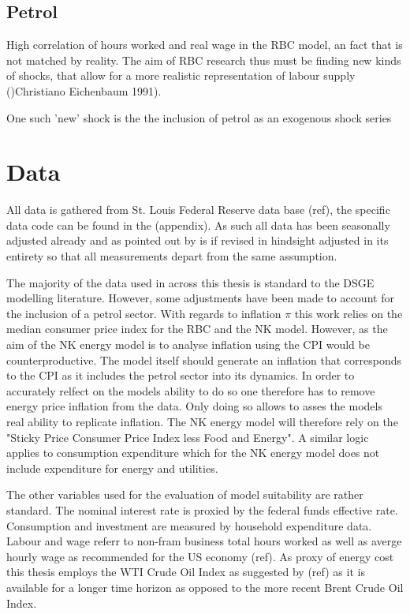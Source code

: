 \documentclass[12pt,a4paper,english]{article} %
\let\oldsection\section
\renewcommand\section{\clearpage\oldsection}
\begin{document}
	
	\subsection{Petrol}
	High correlation of hours worked and real wage in the RBC model, an fact that is not matched by reality. The aim of RBC research thus must be finding new kinds of shocks, that allow for a more realistic representation of labour supply ()Christiano Eichenbaum 1991).
	
	
	One such 'new' shock is the the inclusion of petrol as an exogenous shock series \cite{kim_role_1992}
	
	
	
	
	\section{Data}
	
	All data is gathered from St. Louis Federal Reserve data base (ref), the specific data code can be found in the (appendix). As such all data has been seasonally adjusted already and as pointed out by \cite{pfeifer_guide_2021} is if revised in hindsight adjusted in its entirety so that all measurements depart from the same assumption.
	
	The majority of the data used in across this thesis is standard to the DSGE modelling literature. However, some adjustments have been made to account for the inclusion of a petrol sector.
	With regards to inflation $\pi$ this work relies on the median consumer price index for the RBC and the NK model. However, as the aim of the NK energy model is to analyse inflation using the CPI would be counterproductive. The model itself should generate an inflation that corresponds to the CPI as it includes the petrol sector into its dynamics. In order to accurately relfect on the models ability to do so one therefore has to remove energy price inflation from the data. Only doing so allows to asses the models real ability to replicate inflation. The NK energy model will therefore rely on the "Sticky Price Consumer Price Index less Food and Energy". A similar logic applies to consumption expenditure which for the NK energy model does not include expenditure for energy and utilities.
	
	The other variables used for the evaluation of model suitability are rather standard. The nominal interest rate is proxied by the federal funds effective rate. Consumption and investment are measured by household expenditure data. Labour and wage referr to non-fram business total hours worked as well as averge hourly wage as recommended for the US economy (ref). As proxy of energy cost this thesis employs the WTI Crude Oil Index as suggested by (ref) as it is available for a longer time horizon as opposed to the more recent Brent Crude Oil Index.
	
\end{document}
